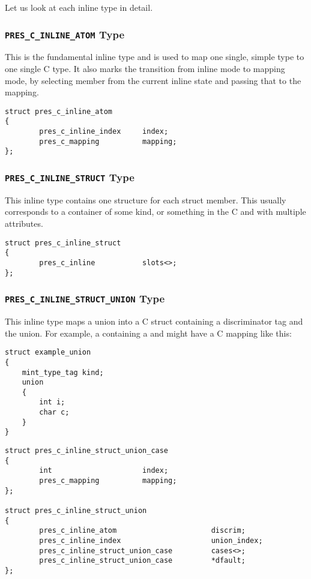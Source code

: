 Let us look at each \PRESC{} inline type in detail.

\subsubsection{\texttt{PRES\_C\_INLINE\_ATOM} Type}

This is the fundamental inline type and is used to map one single, simple
\MINT{} type to one single C type.  It also marks the transition from inline
mode to mapping mode, by selecting \CAST{} member  from the
current inline state and passing that to the mapping.

\begin{verbatim}
struct pres_c_inline_atom
{
        pres_c_inline_index     index;
        pres_c_mapping          mapping;
};
\end{verbatim}

\subsubsection{\texttt{PRES\_C\_INLINE\_STRUCT} Type}

This inline type contains one  structure for each
struct member.  This usually corresponds to a container of some kind, or
something in the C and \MINT{} with multiple attributes.

\begin{verbatim}
struct pres_c_inline_struct
{
        pres_c_inline           slots<>;
};
\end{verbatim}

\subsubsection{\texttt{PRES\_C\_INLINE\_STRUCT\_UNION} Type}

This inline type maps a \MINT{} union into a C struct containing a
discriminator tag and the union.  For example, a 
containing a  and  might have
a C mapping like this:

\begin{verbatim}
struct example_union 
{
    mint_type_tag kind;
    union 
    {
        int i;
        char c;
    }
}
\end{verbatim}
   
\begin{verbatim}
struct pres_c_inline_struct_union_case
{
        int                     index;
        pres_c_mapping          mapping;
};

struct pres_c_inline_struct_union
{
        pres_c_inline_atom                      discrim;
        pres_c_inline_index                     union_index;
        pres_c_inline_struct_union_case         cases<>;
        pres_c_inline_struct_union_case         *dfault;
};
\end{verbatim}

